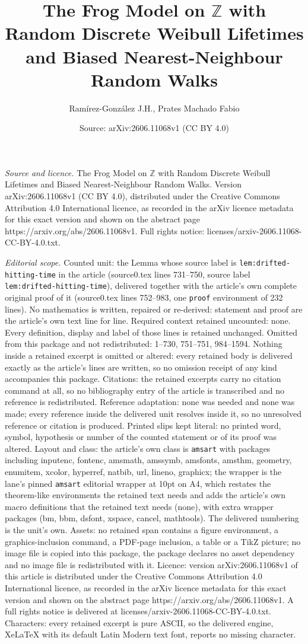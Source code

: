 \documentclass[10pt,a4paper]{amsart}
\title[The Frog Model on $\mathbb Z$ with Random Discrete Weibull L]{The Frog Model on $\mathbb Z$ with Random Discrete Weibull Lifetimes and Biased Nearest-Neighbour Random Walks}
\author{Ram\'irez-Gonz\'alez J.H., Prates Machado Fabio}
\date{Source: arXiv:2606.11068v1 (CC BY 4.0)}
\begin{document}
\maketitle

\noindent\emph{Source and licence.} The Frog Model on $\mathbb Z$ with Random Discrete Weibull Lifetimes and Biased Nearest-Neighbour Random Walks. Version arXiv:2606.11068v1 (CC BY 4.0), distributed under the Creative Commons Attribution 4.0 International licence, as recorded in the arXiv licence metadata for this exact version and shown on the abstract page https://arxiv.org/abs/2606.11068v1. Full rights notice: licenses/arxiv-2606.11068-CC-BY-4.0.txt.\par\smallskip

\noindent\textit{Editorial scope.} Counted unit: the Lemma whose source label is \texttt{lem:drifted-hitting-time} in the article (source0.tex lines 731--750, source label \texttt{lem:drifted-hitting-time}), delivered together with the article's own complete original proof of it (source0.tex lines 752--983, one \texttt{proof} environment of 232 lines). No mathematics is written, repaired or re-derived: statement and proof are the article's own text line for line. Required context retained uncounted: none. Every definition, display and label of those lines is retained unchanged. Omitted from this package and not redistributed: 1--730, 751--751, 984--1594. Nothing inside a retained excerpt is omitted or altered: every retained body is delivered exactly as the article's lines are written, so no omission receipt of any kind accompanies this package. Citations: the retained excerpts carry no citation command at all, so no bibliography entry of the article is transcribed and no reference is redistributed. Reference adaptation: none was needed and none was made; every reference inside the delivered unit resolves inside it, so no unresolved reference or citation is produced. Printed slips kept literal: no printed word, symbol, hypothesis or number of the counted statement or of its proof was altered. Layout and class: the article's own class is \texttt{amsart} with packages including inputenc, fontenc, amsmath, amssymb, amsfonts, amsthm, geometry, enumitem, xcolor, hyperref, natbib, url, lineno, graphicx; the wrapper is the lane's pinned \texttt{amsart} editorial wrapper at 10pt on A4, which restates the theorem-like environments the retained text needs and adds the article's own macro definitions that the retained text needs (none), with extra wrapper packages (bm, bbm, dsfont, xspace, cancel, mathtools). The delivered numbering is the unit's own. Assets: no retained span contains a figure environment, a graphics-inclusion command, a PDF-page inclusion, a table or a TikZ picture; no image file is copied into this package, the package declares no asset dependency and no image file is redistributed with it. Licence: version arXiv:2606.11068v1 of this article is distributed under the Creative Commons Attribution 4.0 International licence, as recorded in the arXiv licence metadata for this exact version and shown on the abstract page https://arxiv.org/abs/2606.11068v1. A full rights notice is delivered at licenses/arxiv-2606.11068-CC-BY-4.0.txt. Characters: every retained excerpt is pure ASCII, so the delivered engine, XeLaTeX with its default Latin Modern text font, reports no missing character.
\end{document}
